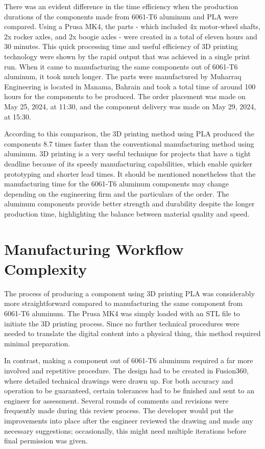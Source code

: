     There was an evident difference in the time efficiency when the production durations of the components
    made from 6061-T6 aluminum and PLA were compared. Using a Prusa MK4, the parts - which included
    4x motor-wheel shafts, 2x rocker axles, and 2x boogie axles - were created in a total of eleven hours
    and 30 minutes. This quick processing time and useful efficiency of 3D printing technology were shown by
    the rapid output that was achieved in a single print run. When it came to manufacturing the same
    components out of 6061-T6 aluminum, it took much longer. The parts were manufactured by Muharraq
    Engineering is located in Manama, Bahrain and took a total time of around 100 hours for the components to
    be produced. The order placement was made on May 25, 2024, at 11:30, and the component delivery was
    made on May 29, 2024, at 15:30.

    According to this comparison, the 3D printing method using PLA produced the components 8.7 times
    faster than the conventional manufacturing method using aluminum. 3D printing is a very useful
    technique for projects that have a tight deadline because of its speedy manufacturing capabilities, which
    enable quicker prototyping and shorter lead times. It should be mentioned nonetheless that the
    manufacturing time for the 6061-T6 aluminum components may change depending on the engineering
    firm and the particulars of the order. The aluminum components provide better strength and durability
    despite the longer production time, highlighting the balance between material quality and speed.

\section{Manufacturing Workflow Complexity}

    The process of producing a component using 3D printing PLA was considerably more
    straightforward compared to manufacturing the same component from 6061-T6 aluminum. The Prusa
    MK4 was simply loaded with an STL file to initiate the 3D printing process. Since no further technical
    procedures were needed to translate the digital content into a physical thing, this method required
    minimal preparation.

    In contrast, making a component out of 6061-T6 aluminum required a far more involved and repetitive
    procedure. The design had to be created in Fusion360, where detailed technical drawings were drawn up.
    For both accuracy and operation to be guaranteed, certain tolerances had to be finished and sent to an
    engineer for assessment. Several rounds of comments and revisions were frequently made during this
    review process. The developer would put the improvements into place after the engineer reviewed the
    drawing and made any necessary suggestions; occasionally, this might need multiple iterations before
    final permission was given.

